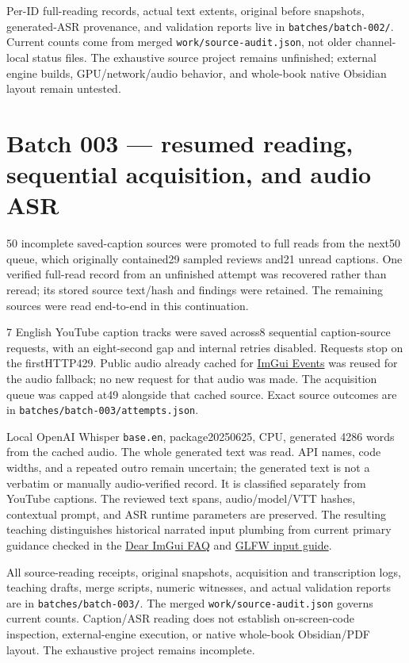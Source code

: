 Per-ID full-reading records, actual text extents, original before snapshots, generated-ASR provenance, and validation reports live in \texttt{batches/batch-002/}. Current counts come from merged \texttt{work/source-audit.json}, not older channel-local status files. The exhaustive source project remains unfinished; external engine builds, GPU/network/audio behavior, and whole-book native Obsidian layout remain untested.

\section{Batch 003 --- resumed reading, sequential acquisition, and audio ASR}\label{appendix-877738f6f4d2-batch-003-resumed-reading-sequential-acquisition-and-audio-asr}

50 incomplete saved-caption sources were promoted to full reads from the next50 queue, which originally contained29 sampled reviews and21 unread captions. One verified full-read record from an unfinished attempt was recovered rather than reread; its stored source text/hash and findings were retained. The remaining sources were read end-to-end in this continuation.

7 English YouTube caption tracks were saved across8 sequential caption-source requests, with an eight-second gap and internal retries disabled. Requests stop on the firstHTTP429. Public audio already cached for \href{https://www.youtube.com/watch?v=yBP1gSbQPPM}{ImGui Events} was reused for the audio fallback; no new request for that audio was made. The acquisition queue was capped at49 alongside that cached source. Exact source outcomes are in \texttt{batches/batch-003/attempts.json}.

Local OpenAI Whisper \texttt{base.en}, package20250625, CPU, generated 4286 words from the cached audio. The whole generated text was read. API names, code widths, and a repeated outro remain uncertain; the generated text is not a verbatim or manually audio-verified record. It is classified separately from YouTube captions. The reviewed text spans, audio/model/VTT hashes, contextual prompt, and ASR runtime parameters are preserved. The resulting teaching distinguishes historical narrated input plumbing from current primary guidance checked in the \href{https://github.com/ocornut/imgui/blob/master/docs/FAQ.md}{Dear ImGui FAQ} and \href{https://www.glfw.org/docs/latest/input_guide.html}{GLFW input guide}.

All source-reading receipts, original snapshots, acquisition and transcription logs, teaching drafts, merge scripts, numeric witnesses, and actual validation reports are in \texttt{batches/batch-003/}. The merged \texttt{work/source-audit.json} governs current counts. Caption/ASR reading does not establish on-screen-code inspection, external-engine execution, or native whole-book Obsidian/PDF layout. The exhaustive project remains incomplete.

